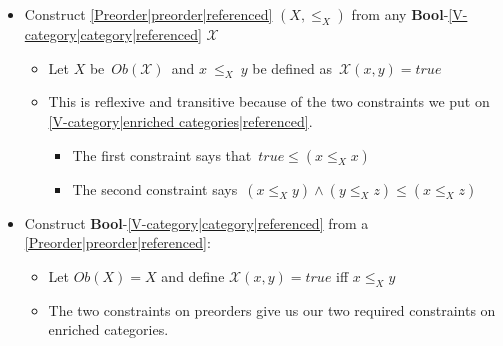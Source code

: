 \begin{itemize}
    \item Construct \ref{Preorder|preorder|referenced} $(X,\leq_X)$ from any \textbf{Bool}-\ref{V-category|category|referenced} $\mathcal{X}$
          \begin{itemize}
            \item Let $X$ be \,$Ob(\mathcal{X})$\, and $x\ \leq_X\ y$ be defined as \,$\mathcal{X}(x,y)=true$\,
            \item This is reflexive and transitive because of the two constraints we put on \ref{V-category|enriched categories|referenced}.
                  \begin{itemize}
                    \item The first constraint says that \,$true \leq (x \leq_X x)$\,
                    \item The second constraint says \,$(x \leq_X y) \land (y \leq_X z) \leq (x \leq_X z)$\,
                  \end{itemize}
          \end{itemize}
    \item Construct \textbf{Bool}-\ref{V-category|category|referenced} from a \ref{Preorder|preorder|referenced}: \,
          \begin{itemize}
            \item Let $Ob(X)=X$ and define $\mathcal{X}(x,y)=true$ iff $x \leq_X y$
            \item The two constraints on preorders give us our two required constraints on enriched categories.
          \end{itemize}\,
  \end{itemize}

